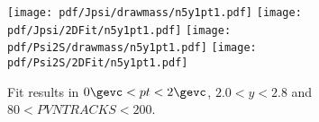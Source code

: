 \begin{figure}[H]
\begin{center}
\texttt{[image: pdf/Jpsi/drawmass/n5y1pt1.pdf]}
\texttt{[image: pdf/Jpsi/2DFit/n5y1pt1.pdf]}
\vspace*{-0.5cm}
\texttt{[image: pdf/Psi2S/drawmass/n5y1pt1.pdf]}
\texttt{[image: pdf/Psi2S/2DFit/n5y1pt1.pdf]}
\vspace*{-0.5cm}
\end{center}
\caption{Fit results in $0\gevc<pt<2\gevc$, $2.0<y<2.8$ and $80<PVNTRACKS<200$.}
\label{Fitn5y1pt1}
\end{figure}
